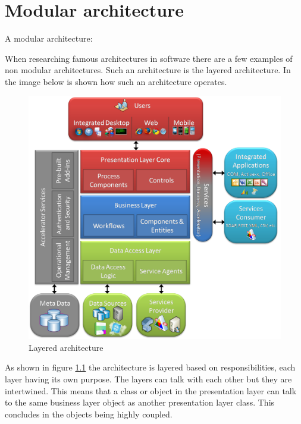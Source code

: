\chapter{Modular architecture}
\label{sec:ModularArchitecture}

A modular architecture:

When researching famous architectures in software there are a few examples of non modular architectures. Such an architecture is the layered architecture. In the image below is shown how such an architecture operates.

\begin{figure}[H]
	\includegraphics[width=\linewidth]{layered_architecture.png}
        \caption{Layered architecture \cite{layeredArchitecture}}
        \label{fig:LayeredArchitecture}
\end{figure}

As shown in figure \ref{fig:LayeredArchitecture} the architecture is layered based on responsibilities, each layer having its own purpose. The layers can talk with each other but they are intertwined. This means that a class or object in the presentation layer can talk to the same business layer object as another presentation layer class. This concludes in the objects being highly coupled.

